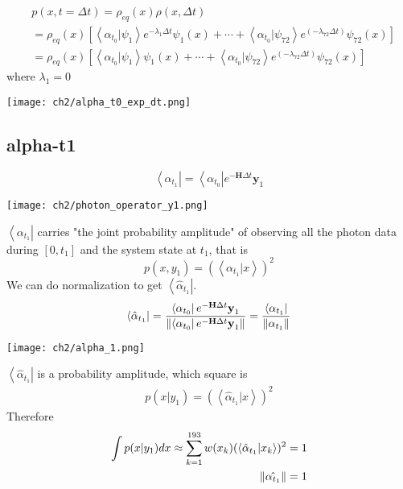 \begin{definition}[$\rho(x, t=\Delta t) = \left<\alpha_{t_0}| e^{-\textbf{H}\Delta t}|x \right>$]
\begin{align*}
        &p(x,t=\Delta t) = \rho_{eq}(x) \rho(x, \Delta t)\\
        &= \rho_{eq}(x)[ \left< \alpha_{t_0} | \psi_1 \right> e^{-\lambda_{1}\Delta t}\psi_1(x) + \cdots+ \left< \alpha_{t_0} | \psi_{72} \right> e^{(-\lambda_{72}\Delta t)}\psi_{72}(x)]  \\
        &=  \rho_{eq}(x)[ \left< \alpha_{t_0} | \psi_1 \right>\psi_1(x)+ \cdots + \left< \alpha_{t_0} | \psi_{72} \right> e^{(-\lambda_{72}\Delta t)}\psi_{72}(x)]  
\end{align*}
where $\lambda_1 = 0$
\begin{center}
        \texttt{[image: ch2/alpha\_t0\_exp\_dt.png]}   
\end{center}
\end{definition}

\subsection{alpha-t1}
\begin{definition}
\begin{equation}
        \left< \alpha_{t_1} \right| = \left< \alpha_{t_0} \right| e^{-\textbf{H} \Delta t} \textbf{y}_1     
\end{equation}
\begin{center}
        \texttt{[image: ch2/photon\_operator\_y1.png]}   
\end{center}
$\left< \alpha_{t_1} \right|$ carries "the joint probability amplitude" of observing all the photon data during $[0, t_1]$ and the system state at $t_1$, that is
\begin{equation}
        p(x, y_1) = (\left< \alpha_{t_1} | x \right>)^2
\end{equation}
We can do normalization to get $\left< \hat{\alpha}_{t_1} \right|$.
\begin{equation}
        \left< \hat{\alpha}_{t_1} \right| = \frac{\left< \alpha_{t_0} \right| e^{-\textbf{H}\Delta t} \textbf{y}_1}{\left\lVert\left< \alpha_{t_0} \right| e^{-\textbf{H}\Delta t} \textbf{y}_1\right\rVert} = \frac{\left< \alpha_{t_{1}} \right|}{\left\lVert\alpha_{t_{1}}\right\rVert}
\end{equation}
\begin{center}
        \texttt{[image: ch2/alpha\_1.png]}   
\end{center}
$\left< \hat{\alpha}_{t_1} \right|$ is a probability amplitude, which square is 
\begin{align*}
        p(x | y_1) =  (\left< \hat{\alpha}_{t_1} | x \right>)^2
\end{align*}
Therefore
\begin{align*}
        \int p(x|y_1) dx \approx \sum_{k=1}^{193}w(x_k)(\left< \hat{\alpha}_{t_1} | x_k \right>)^2 &= 1 \\
        \left\lVert\hat{\alpha_{t_1}}\right\rVert &= 1
\end{align*}
\end{definition}

